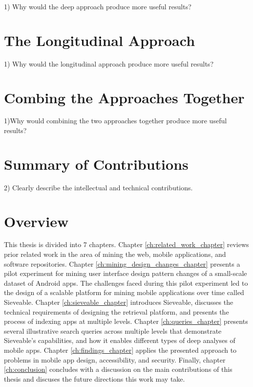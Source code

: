 1) Why would the deep approach produce more useful results?
\pagebreak

\section{The Longitudinal Approach}
1) Why would the longitudinal approach produce more useful results?
\pagebreak

\section{Combing the Approaches Together}
1)Why would combining the two approaches together produce more useful results?
\pagebreak

\section{Summary of Contributions}
2) Clearly describe the intellectual and technical contributions.
\pagebreak

\section{Overview}
This thesis is divided into 7 chapters.
Chapter \ref{ch:related_work_chapter} reviews prior related work in the area of mining the web, mobile applications, and software repositories.
Chapter \ref{ch:mining_design_changes_chapter} presents a pilot experiment for mining user interface design pattern changes of a small-scale dataset of Android apps.
The challenges faced during this pilot experiment led to the design of a scalable platform for mining mobile applications over time called Sieveable.
Chapter \ref{ch:sieveable_chapter} introduces Sieveable, discusses the technical requirements of designing the retrieval platform, and presents the process of indexing apps at multiple levels.
Chapter \ref{ch:queries_chapter} presents several illustrative search queries across multiple levels that demonstrate Sieveable's capabilities, and how it enables different types of deep analyses of mobile apps.
Chapter \ref{ch:findings_chapter} applies the presented approach to problems in mobile app design, accessibility, and security.
Finally, chapter \ref{ch:conclusion} concludes with a discussion on the main contributions of this thesis and discuses the future directions this work may take.

